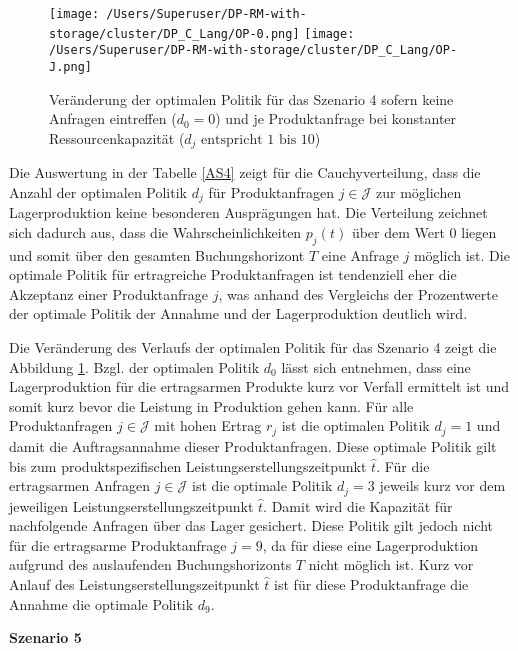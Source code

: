 \begin{figure}[h!]     
\begin{center}
\texttt{[image: /Users/Superuser/DP-RM-with-storage/cluster/DP\_C\_Lang/OP-0.png]}
\texttt{[image: /Users/Superuser/DP-RM-with-storage/cluster/DP\_C\_Lang/OP-J.png]}
    \caption{Veränderung der optimalen Politik für das Szenario 4 sofern keine Anfragen eintreffen ($d_0=0$) und je Produktanfrage bei konstanter Ressourcenkapazität ($d_j\text{ entspricht }1\text{ bis }10$)}  \label{SV4}
  \end{center}
\end{figure}

Die Auswertung in der Tabelle \ref{AS4} zeigt für die Cauchyverteilung, dass die Anzahl der optimalen Politik $d_j$ für Produktanfragen $j\in\mathcal{J}$ zur möglichen Lagerproduktion keine besonderen Ausprägungen hat. Die Verteilung zeichnet sich dadurch aus, dass die Wahrscheinlichkeiten $p_j(t)$ über dem Wert $0$ liegen und somit über den gesamten Buchungshorizont $T$ eine Anfrage $j$ möglich ist. Die optimale Politik für ertragreiche Produktanfragen ist tendenziell eher die Akzeptanz einer Produktanfrage $j$, was anhand des Vergleichs der Prozentwerte der optimale Politik der Annahme und der Lagerproduktion deutlich wird.

Die Veränderung des Verlaufs der optimalen Politik für das Szenario 4 zeigt die Abbildung \ref{SV4}. Bzgl. der optimalen Politik $d_0$ lässt sich entnehmen, dass eine Lagerproduktion für die ertragsarmen Produkte kurz vor Verfall ermittelt ist und somit kurz bevor die Leistung in Produktion gehen kann. Für alle Produktanfragen $j\in\mathcal{J}$ mit hohen Ertrag $r_j$ ist die optimalen Politik $d_j=1$ und damit die Auftragsannahme dieser Produktanfragen. Diese optimale Politik gilt bis zum produktspezifischen Leistungserstellungszeitpunkt $\hat t$. Für die ertragsarmen Anfragen $j\in\mathcal{J}$ ist die optimale Politik $d_j=3$ jeweils kurz vor dem jeweiligen Leistungserstellungszeitpunkt $\hat t$. Damit wird die Kapazität für nachfolgende Anfragen über das Lager gesichert. Diese Politik gilt jedoch nicht für die ertragsarme Produktanfrage $j=9$, da für diese eine Lagerproduktion aufgrund des auslaufenden Buchungshorizonts $T$ nicht möglich ist. Kurz vor Anlauf des Leistungserstellungszeitpunkt $\hat t$ ist für diese Produktanfrage die Annahme die optimale Politik $d_9$.

\textbf{Szenario 5}

